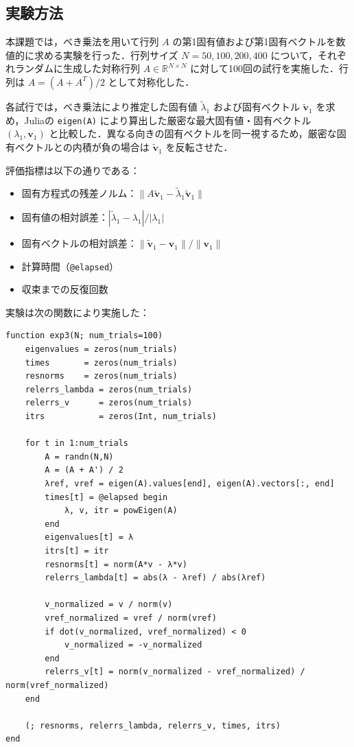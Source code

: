 \documentclass[a4paper,11pt]{ltjsarticle}
\begin{document}
\subsection{実験方法}
本課題では，べき乗法を用いて行列 $A$ の第1固有値および第1固有ベクトルを数値的に求める実験を行った．行列サイズ $N = 50, 100, 200, 400$ について，それぞれランダムに生成した対称行列 $A \in \mathbb{R}^{N \times N}$ に対して100回の試行を実施した．行列は $A = (A + A^T)/2$ として対称化した．

各試行では，べき乗法により推定した固有値 $\tilde{\lambda}_1$ および固有ベクトル $\tilde{\boldsymbol{v}}_1$ を求め，Juliaの \verb|eigen(A)| により算出した厳密な最大固有値・固有ベクトル $(\lambda_1, \boldsymbol{v}_1)$ と比較した．異なる向きの固有ベクトルを同一視するため，厳密な固有ベクトルとの内積が負の場合は $\tilde{\boldsymbol{v}}_1$ を反転させた．

評価指標は以下の通りである：
\begin{itemize}
  \item 固有方程式の残差ノルム：$\|A\tilde{\boldsymbol{v}}_1 - \tilde{\lambda}_1 \tilde{\boldsymbol{v}}_1\|$
  \item 固有値の相対誤差：$|\tilde{\lambda}_1 - \lambda_1| / |\lambda_1|$
  \item 固有ベクトルの相対誤差：$\|\tilde{\boldsymbol{v}}_1 - \boldsymbol{v}_1\| / \|\boldsymbol{v}_1\|$
  \item 計算時間（\verb|@elapsed|）
  \item 収束までの反復回数
\end{itemize}

実験は次の関数により実施した：
\begin{verbatim}
function exp3(N; num_trials=100)
    eigenvalues = zeros(num_trials)
    times       = zeros(num_trials)
    resnorms    = zeros(num_trials)
    relerrs_lambda = zeros(num_trials)
    relerrs_v      = zeros(num_trials)
    itrs           = zeros(Int, num_trials)

    for t in 1:num_trials
        A = randn(N,N)
        A = (A + A') / 2
        λref, vref = eigen(A).values[end], eigen(A).vectors[:, end]
        times[t] = @elapsed begin
            λ, v, itr = powEigen(A)
        end
        eigenvalues[t] = λ
        itrs[t] = itr
        resnorms[t] = norm(A*v - λ*v)
        relerrs_lambda[t] = abs(λ - λref) / abs(λref)

        v_normalized = v / norm(v)
        vref_normalized = vref / norm(vref)
        if dot(v_normalized, vref_normalized) < 0
            v_normalized = -v_normalized
        end
        relerrs_v[t] = norm(v_normalized - vref_normalized) / norm(vref_normalized)
    end

    (; resnorms, relerrs_lambda, relerrs_v, times, itrs)
end
\end{verbatim}
\end{document}
